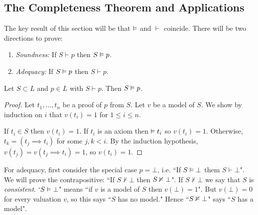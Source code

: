 \documentclass[10pt,a4paper]{article}
\begin{document}
\subsection{The Completeness Theorem and Applications}
The key result of this section will be that $\vDash$ and $\vdash$ coincide. There will be two directions to prove:
\begin{enumerate}
\item \emph{Soundness:} If $S \vdash p$ then $S \vDash p$.
\item \emph{Adequacy:} If $S \vDash p$ then $S \vdash p$.
\end{enumerate}
\begin{proposition}
Let $S \subset L$ and $p \in L$ with $S \vdash p$. Then $S \vDash p$.
\end{proposition}
\begin{proof}
Let $t_1, \ldots, t_n$ be a proof of $p$ from $S$. Let $v$ be a model of $S$. We show by induction on $i$ that $v(t_i) = 1$ for $1 \leq i \leq n$.

If $t_i \in S$ then $v(t_i) = 1$. If $t_i$ is an axiom then $\vDash t_i$ so $v(t_i) = 1$. Otherwise, $t_k = (t_j \implies t_i)$ for some $j, k < i$. By the induction hypothesis, $v(t_j) = v(t_j \implies t_i) = 1$, so $v(t_i) = 1$.
\end{proof}

For adequacy, first consider the special case $p = \bot$, i.e. ``If $S \vDash \bot$ them $S \vdash \bot$". We will prove the contrapositive: ``If $S \nvdash \bot$ then $S \nvDash \bot$". If $S \nvdash \bot$ we say that $S$ is \emph{consistent}. $`S \vDash \bot$" means ``if $v$ is a model of $S$ then $v(\bot)=1$". But $v(\bot) = 0$ for every valuation $v$, so this says ``$S$ has no model." Hence ``$S \nvDash \bot$" says ``$S$ has a model".
\end{document}
